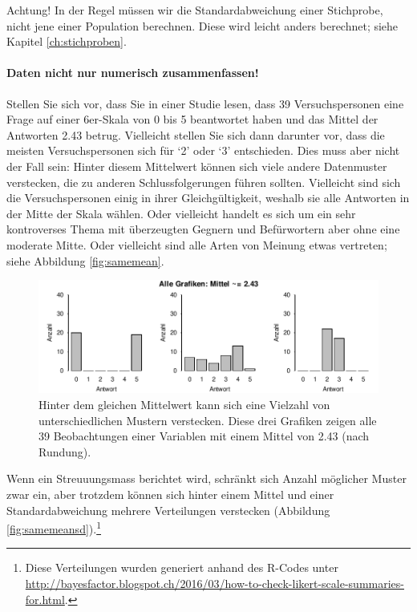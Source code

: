 \documentclass[oneside, 10pt]{book}\usepackage[]{graphicx}\usepackage[]{xcolor}
\newenvironment{knitrout}{}{} %
\begin{document}
Achtung! In der Regel müssen wir die Standardabweichung einer
Stichprobe, nicht jene einer
Population berechnen. Diese wird leicht anders berechnet;
siehe Kapitel \ref{ch:stichproben}.

\paragraph{Daten nicht nur numerisch zusammenfassen!}
Stellen Sie sich vor, dass Sie in einer Studie lesen,
dass 39 Versuchspersonen eine Frage auf einer 6er-Skala
von 0 bis 5 beantwortet haben und das Mittel der
Antworten 2.43 betrug.
Vielleicht stellen Sie sich dann darunter vor, dass die
meisten Versuchspersonen sich für `2' oder `3' entschieden.
Dies muss aber nicht der Fall sein: Hinter diesem Mittelwert
können sich viele andere Datenmuster verstecken, die zu
anderen Schlussfolgerungen führen sollten.
Vielleicht sind sich die Versuchspersonen einig
in ihrer Gleichgültigkeit, weshalb sie alle Antworten
in der Mitte der Skala wählen. Oder vielleicht handelt
es sich um ein sehr kontroverses Thema mit überzeugten
Gegnern und Befürwortern aber ohne eine moderate Mitte.
Oder vielleicht sind alle Arten von Meinung etwas vertreten;
siehe Abbildung \ref{fig:samemean}.

\begin{knitrout}
\color{fgcolor}\begin{figure}[tp]

{\centering \includegraphics[width=\textwidth]{figs/unnamed-chunk-110-1} 

}

\caption{Hinter dem gleichen Mittelwert kann sich eine Vielzahl von unterschiedlichen Mustern verstecken. Diese drei Grafiken zeigen alle 39 Beobachtungen einer Variablen mit einem Mittel von 2.43 (nach Rundung).\label{fig:samemean}}\label{fig:unnamed-chunk-110}
\end{figure}

\end{knitrout}

Wenn ein Streuuungsmass berichtet wird, schränkt
sich Anzahl möglicher Muster zwar ein, aber trotzdem
können sich hinter einem Mittel und einer Standardabweichung
mehrere Verteilungen verstecken
(Abbildung \ref{fig:samemeansd}).\footnote{Diese Verteilungen wurden generiert anhand des R-Codes unter \url{http://bayesfactor.blogspot.ch/2016/03/how-to-check-likert-scale-summaries-for.html}.}
\end{document}

